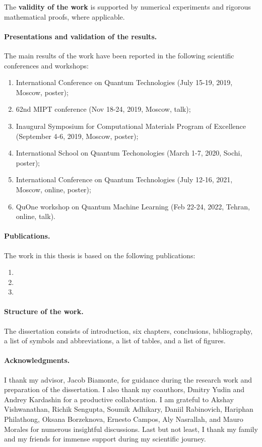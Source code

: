 The \textbf{validity of the work} is supported by numerical experiments and rigorous mathematical proofs, where applicable.

\paragraph{Presentations and validation of the results.}
The main results of the work have been reported in the following scientific conferences and workshops:

\begin{enumerate}
    \item International Conference on Quantum Technologies (July 15-19, 2019, Moscow, poster);
    \item 62nd MIPT conference (Nov 18-24, 2019, Moscow, talk);
    \item Inaugural Symposium for Computational Materials Program of Excellence (September 4-6, 2019, Moscow, poster);
    \item International School on Quantum Techonologies (March 1-7, 2020, Sochi, poster);
    \item International Conference on Quantum Technologies (July 12-16, 2021, Moscow, online, poster);
    \item QuOne workshop on Quantum Machine Learning (Feb 22-24, 2022, Tehran, online, talk).
\end{enumerate}

\paragraph{Publications.}
The work in this thesis is based on the following publications:

\begin{enumerate}
    \item {}
    \item {}
    \item {}
\end{enumerate}

\paragraph{Structure of the work.} The dissertation consists of introduction, six chapters, conclusions, bibliography, a list of symbols and abbreviations, a list of tables, and a list of figures.

\paragraph{Acknowledgments.} I thank my advisor, Jacob Biamonte, for guidance during the research work and preparation of the dissertation. I also thank my coauthors, Dmitry Yudin and Andrey Kardashin for a productive collaboration. I am grateful to Akshay Vishwanathan, Richik Sengupta, Soumik Adhikary, Daniil Rabinovich, Hariphan Philathong, Oksana Borzeknova, Ernesto Campos, Aly Nasrallah, and Mauro Morales for numerous insightful discussions. Last but not least, I thank my family and my friends for immense support during my scientific journey.


